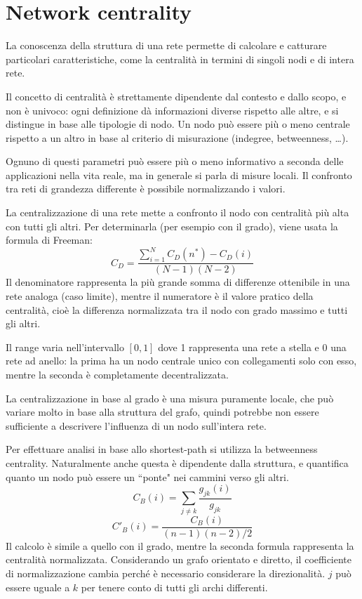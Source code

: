\section{Network centrality}
La conoscenza della struttura di una rete permette di calcolare e catturare 
particolari caratteristiche, come la centralità in termini di singoli nodi e di 
intera rete.

Il concetto di centralità è strettamente dipendente dal contesto e dallo scopo, e non è univoco: ogni definizione dà informazioni diverse rispetto alle altre, e si distingue in base alle tipologie di nodo. Un nodo può essere più o meno centrale rispetto a un altro in base al criterio di misurazione (indegree, betweenness, \dots). 

Ognuno di questi parametri può essere più o meno informativo a seconda 
delle applicazioni nella vita reale, ma in generale si parla di misure locali. Il 
confronto tra reti di grandezza differente è possibile normalizzando i valori. 

La centralizzazione di una rete mette a confronto il nodo con centralità più alta con tutti gli altri. Per determinarla (per esempio con il grado), viene usata la formula di Freeman:
$$C_D = \frac{\sum_{i=1}^{N} C_D(n^*) - C_D(i)}{(N - 1) (N - 2)}$$
Il denominatore rappresenta la più grande somma di differenze ottenibile in una rete analoga (caso limite), mentre il numeratore è il valore pratico della centralità, cioè la differenza normalizzata tra il nodo con grado massimo e tutti gli altri.

Il range varia nell'intervallo $[0, 1]$ dove 1 rappresenta una rete a stella e 0 una rete ad anello: la prima ha un nodo centrale unico con collegamenti solo con esso, mentre la seconda è completamente decentralizzata. 

La centralizzazione in base al grado è una misura puramente locale, che può variare molto in base alla struttura del grafo, quindi potrebbe non essere sufficiente a descrivere l'influenza di un nodo sull'intera rete. 

Per effettuare analisi in base allo shortest-path si utilizza la betweenness centrality. Naturalmente anche questa è dipendente dalla struttura, e quantifica quanto un nodo può essere un  ``ponte" nei cammini verso gli altri.
$$C_B(i) = \sum_{j \neq k}\frac{g_{jk}(i)}{g_{jk}}$$
$$C'_B(i) = \frac{C_B(i)}{(n - 1) (n - 2) / 2}$$
Il calcolo è simile a quello con il grado, mentre la seconda formula rappresenta la centralità normalizzata. Considerando un grafo orientato e diretto, il coefficiente di normalizzazione cambia perché è necessario considerare la direzionalità. $j$ può essere uguale a $k$ per tenere conto di tutti gli archi differenti.

